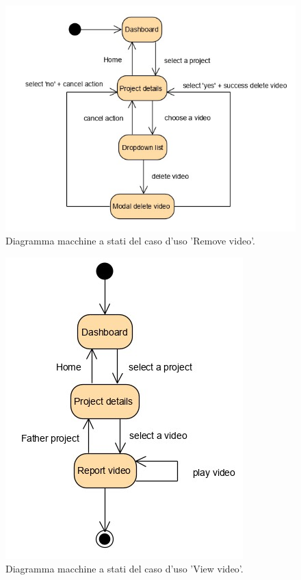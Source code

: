 \begin{figure}[H]
	\centering
	\caption{Diagramma macchine a stati del caso d'uso 'Remove video'.}
	\label{fig:diagramma-macchine-stati:remove-video}
	\includegraphics[width=\textwidth]{images/diagramma-macchine-stati/remove-video}
\end{figure}

\begin{figure}[H]
	\centering
	\caption{Diagramma macchine a stati del caso d'uso 'View video'.}
	\label{fig:diagramma-macchine-stati:view-video}
	\includegraphics[width=\textwidth]{images/diagramma-macchine-stati/view-video}
\end{figure}

